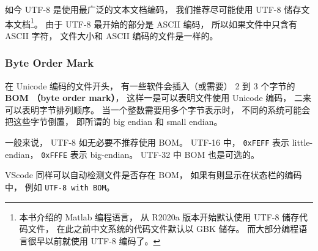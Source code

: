 如今 UTF-8 是使用最广泛的文本文档编码， 我们推荐尽可能使用 UTF-8 储存文本文档\footnote{本书介绍的 Matlab 编程语言， 从 R2020a 版本开始默认使用 UTF-8 储存代码文件， 在此之前中文系统的代码文件默认以 GBK 储存。 而大部分编程语言很早以前就使用 UTF-8 编码了。}。 由于 UTF-8 最开始的部分是 ASCII 编码， 所以如果文件中只含有 ASCII 字符， 文件大小和 ASCII 编码的文件是一样的。

\subsubsection{Byte Order Mark}
在 Unicode 编码的文件开头， 有一些软件会插入（或需要） 2 到 3 个字节的 \textbf{BOM （byte order mark）}， 这样一是可以表明文件使用 Unicode 编码， 二来可以表明字节排列顺序。 当一个整数需要用多个字节表示时， 不同的系统可能会把这些字节倒置， 即所谓的 big endian 和 small endian。

一般来说， UTF-8 如无必要不推荐使用 BOM。 UTF-16 中， \verb|0xFEFF| 表示 little-endian， \verb|0xFFFE| 表示 big-endian。 UTF-32 中 BOM 也是可选的。

VScode 同样可以自动检测文件是否存在 BOM， 如果有则显示在状态栏的编码中， 例如 \verb|UTF-8 with BOM|。
